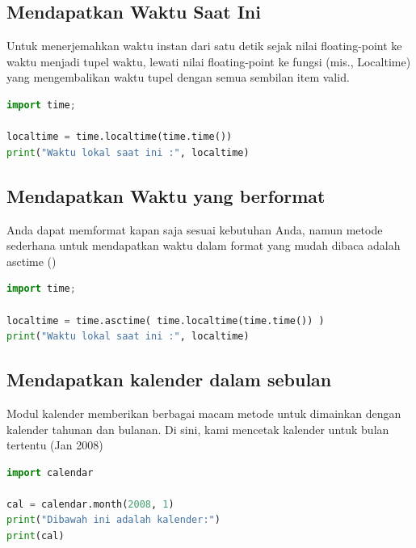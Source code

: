 \subsection{Mendapatkan Waktu Saat Ini}
Untuk menerjemahkan waktu instan dari satu detik sejak nilai floating-point ke waktu menjadi tupel waktu, lewati nilai floating-point ke fungsi (mis., Localtime) yang mengembalikan waktu tupel dengan semua sembilan item valid.
\begin{lstlisting}[language=Python]
import time;

localtime = time.localtime(time.time())
print("Waktu lokal saat ini :", localtime)
\end{lstlisting}

\subsection{Mendapatkan Waktu yang berformat}
Anda dapat memformat kapan saja sesuai kebutuhan Anda, namun metode sederhana untuk mendapatkan waktu dalam format yang mudah dibaca adalah asctime ()
\begin{lstlisting}[language=Python]
import time;

localtime = time.asctime( time.localtime(time.time()) )
print("Waktu lokal saat ini :", localtime)
\end{lstlisting}

\subsection{Mendapatkan kalender dalam sebulan}
Modul kalender memberikan berbagai macam metode untuk dimainkan dengan kalender tahunan dan bulanan. Di sini, kami mencetak kalender untuk bulan tertentu (Jan 2008)
\begin{lstlisting}[language=Python]
import calendar

cal = calendar.month(2008, 1)
print("Dibawah ini adalah kalender:")
print(cal)
\end{lstlisting}

